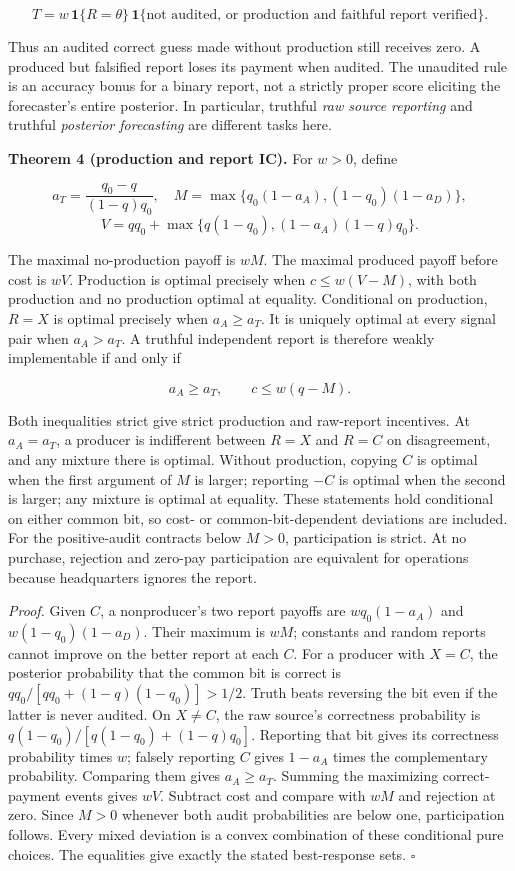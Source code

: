 \documentclass[
  11pt,
]{article}
\begin{document}
\[T=w\,\mathbf1\{R=\theta\}\,
\mathbf1\{\text{not audited, or production and faithful report verified}\}. \tag{I1}\]

Thus an audited correct guess made without production still receives
zero. A produced but falsified report loses its payment when audited.
The unaudited rule is an accuracy bonus for a binary report, not a
strictly proper score eliciting the forecaster's entire posterior. In
particular, truthful \emph{raw source reporting} and truthful
\emph{posterior forecasting} are different tasks here.

\textbf{Theorem 4 (production and report IC).} For \(w>0\), define

\[a_T=\frac{q_0-q}{(1-q)q_0},\quad
M=\max\{q_0(1-a_A),(1-q_0)(1-a_D)\},\]
\[V=q q_0+\max\{q(1-q_0),(1-a_A)(1-q)q_0\}. \tag{I2}\]

The maximal no-production payoff is \(wM\). The maximal produced payoff
before cost is \(wV\). Production is optimal precisely when
\(c\leq w(V-M)\), with both production and no production optimal at
equality. Conditional on production, \(R=X\) is optimal precisely when
\(a_A\geq a_T\). It is uniquely optimal at every signal pair when
\(a_A>a_T\). A truthful independent report is therefore weakly
implementable if and only if

\[a_A\geq a_T,\qquad c\leq w(q-M). \tag{I3}\]

Both inequalities strict give strict production and raw-report
incentives. At \(a_A=a_T\), a producer is indifferent between \(R=X\)
and \(R=C\) on disagreement, and any mixture there is optimal. Without
production, copying \(C\) is optimal when the first argument of \(M\) is
larger; reporting \(-C\) is optimal when the second is larger; any
mixture is optimal at equality. These statements hold conditional on
either common bit, so cost- or common-bit-dependent deviations are
included. For the positive-audit contracts below \(M>0\), participation
is strict. At no purchase, rejection and zero-pay participation are
equivalent for operations because headquarters ignores the report.

\emph{Proof.} Given \(C\), a nonproducer's two report payoffs are
\(wq_0(1-a_A)\) and \(w(1-q_0)(1-a_D)\). Their maximum is \(wM\);
constants and random reports cannot improve on the better report at each
\(C\). For a producer with \(X=C\), the posterior probability that the
common bit is correct is \(q q_0/[q q_0+(1-q)(1-q_0)]>1/2\). Truth beats
reversing the bit even if the latter is never audited. On \(X\ne C\),
the raw source's correctness probability is
\(q(1-q_0)/[q(1-q_0)+(1-q)q_0]\). Reporting that bit gives its
correctness probability times \(w\); falsely reporting \(C\) gives
\(1-a_A\) times the complementary probability. Comparing them gives
\(a_A\geq a_T\). Summing the maximizing correct-payment events gives
\(wV\). Subtract cost and compare with \(wM\) and rejection at zero.
Since \(M>0\) whenever both audit probabilities are below one,
participation follows. Every mixed deviation is a convex combination of
these conditional pure choices. The equalities give exactly the stated
best-response sets. \(\square\)
\end{document}

